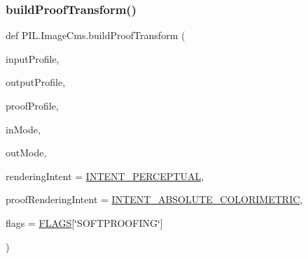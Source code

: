 \subsubsection{\texorpdfstring{build\+Proof\+Transform()}{buildProofTransform()}}
{\footnotesize\ttfamily def P\+I\+L.\+Image\+Cms.\+build\+Proof\+Transform (\begin{DoxyParamCaption}\item[{}]{input\+Profile,  }\item[{}]{output\+Profile,  }\item[{}]{proof\+Profile,  }\item[{}]{in\+Mode,  }\item[{}]{out\+Mode,  }\item[{}]{rendering\+Intent = {\ttfamily \hyperlink{namespacePIL_1_1ImageCms_a5ede11c95f67c7ea71b86e9a9e8a4f87}{I\+N\+T\+E\+N\+T\+\_\+\+P\+E\+R\+C\+E\+P\+T\+U\+AL}},  }\item[{}]{proof\+Rendering\+Intent = {\ttfamily \hyperlink{namespacePIL_1_1ImageCms_a6704a2c2d4e948b9d74a12a567f68b9e}{I\+N\+T\+E\+N\+T\+\_\+\+A\+B\+S\+O\+L\+U\+T\+E\+\_\+\+C\+O\+L\+O\+R\+I\+M\+E\+T\+R\+IC}},  }\item[{}]{flags = {\ttfamily \hyperlink{namespacePIL_1_1ImageCms_a5d515bb9c146f7443320c31c56f35a8f}{F\+L\+A\+GS}\mbox{[}\char`\"{}SOFTPROOFING\char`\"{}\mbox{]}} }\end{DoxyParamCaption})}

